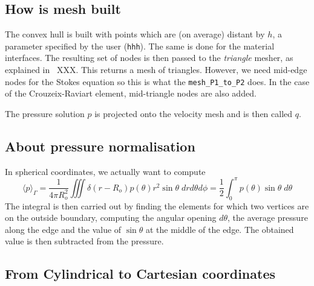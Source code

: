 \subsection*{How is mesh built}

The convex hull is built with points which are (on average) distant by $h$, 
a parameter specified by the user ({\tt hhh}).
The same is done for the material interfaces. 
The resulting set of nodes is then passed to the {\sl triangle} mesher, as explained 
in \stone~XXX.
This returns a mesh of triangles. However, we need mid-edge nodes for the Stokes equation
so this is what the {\tt mesh\_P1\_to\_P2} does. In the case of the Crouzeix-Raviart element, 
mid-triangle nodes are also added. 


The pressure solution $p$ is projected onto the velocity mesh and is then called $q$.





\subsection*{About pressure normalisation}

In spherical coordinates, we actually want to compute 
\[
\langle p \rangle _\Gamma = 
\frac{1}{4\pi R_o^2} \iiint \delta(r-R_o) p(\theta) r^2 \sin\theta \; dr d\theta d\phi 
= \frac{1}{2} \int_0^\pi p(\theta) \sin\theta \; d\theta
\]
The integral is then carried out by finding the elements for which 
two vertices are on the outside boundary, 
computing the angular opening $d\theta$, the average pressure 
along the edge and the value of $\sin\theta$ at the
middle of the edge. 
The obtained value is then subtracted from the pressure. 

\subsection*{From Cylindrical to Cartesian coordinates}









